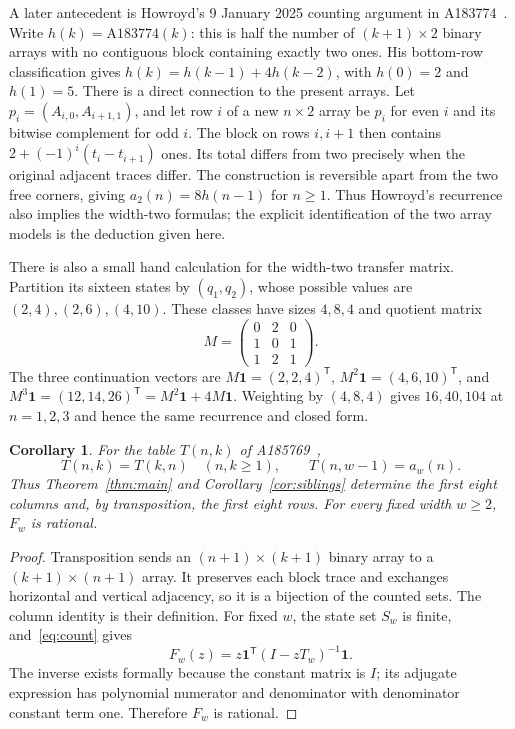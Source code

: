 \documentclass[11pt]{article}
\newtheorem{corollary}[theorem]{Corollary}
\newcommand{\one}{\mathbf{1}}
\begin{document}
A later antecedent is Howroyd's 9 January 2025 counting argument in
A183774~\cite{howroyd}. Write $h(k)=\mathrm{A183774}(k)$: this is half
the number of $(k+1)\times2$ binary arrays with no contiguous block
containing exactly two ones. His bottom-row classification gives
$h(k)=h(k-1)+4h(k-2)$, with $h(0)=2$ and $h(1)=5$.
There is a direct connection to the present arrays. Let
$p_i=(A_{i,0},A_{i+1,1})$, and let row $i$ of a new $n\times2$ array
be $p_i$ for even $i$ and its bitwise complement for odd $i$.
The block on rows $i,i+1$ then contains
$2+(-1)^i(t_i-t_{i+1})$ ones. Its total differs from two precisely when
the original adjacent traces differ. The construction is reversible
apart from the two free corners, giving
$a_2(n)=8h(n-1)$ for $n\ge1$. Thus Howroyd's recurrence also implies
the width-two formulas; the explicit identification of the two array
models is the deduction given here.

There is also a small hand calculation for the width-two transfer matrix.
Partition its sixteen states by $(q_1,q_2)$, whose possible values are
$(2,4),(2,6),(4,10)$. These classes have sizes $4,8,4$ and quotient matrix
\[
 M=\begin{pmatrix}0&2&0\\1&0&1\\1&2&1\end{pmatrix}.
\]
The three continuation vectors are
$M\one=(2,2,4)^{\mathsf T}$,
$M^2\one=(4,6,10)^{\mathsf T}$, and
$M^3\one=(12,14,26)^{\mathsf T}=M^2\one+4M\one$.
Weighting by $(4,8,4)$ gives $16,40,104$ at $n=1,2,3$ and hence the
same recurrence and closed form.

\begin{corollary}\label{cor:parent}
For the table $T(n,k)$ of A185769~\cite{oeistable},
\[
 T(n,k)=T(k,n)\quad(n,k\ge1),\qquad T(n,w-1)=a_w(n).
\]
Thus Theorem~\ref{thm:main} and Corollary~\ref{cor:siblings} determine
the first eight columns and, by transposition, the first eight rows.
For every fixed width $w\ge2$, $F_w$
is rational.
\end{corollary}
\begin{proof}
Transposition sends an $(n+1)\times(k+1)$ binary array to a
$(k+1)\times(n+1)$ array. It preserves each block trace and exchanges
horizontal and vertical adjacency, so it is a bijection of the counted
sets. The column identity is their definition.
For fixed $w$, the state set $S_w$ is finite, and~\eqref{eq:count} gives
\[
 F_w(z)=z\one^{\mathsf T}(I-zT_w)^{-1}\one.
\]
The inverse exists formally because the constant matrix is $I$; its
adjugate expression has polynomial numerator and denominator with
denominator constant term one. Therefore $F_w$ is rational.
\end{proof}
\end{document}
